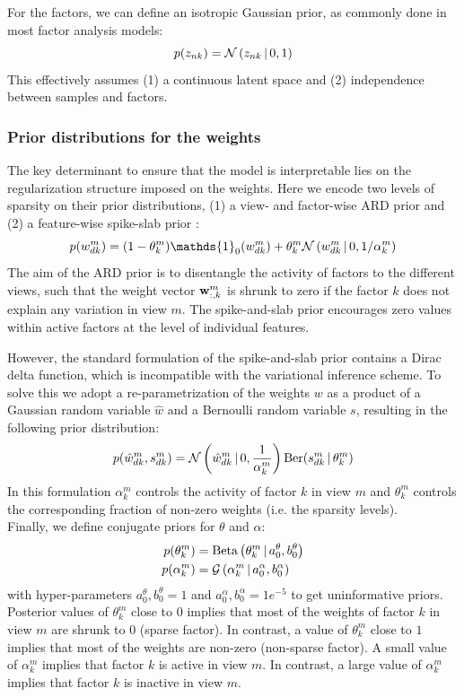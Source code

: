 For the factors, we can define an isotropic Gaussian prior, as commonly done in most factor analysis models:
\begin{equation}
	p(z_{nk}) = \mathcal{N}\left(z_{nk} \,|\, 0,1\right)
\end{equation}
This effectively  assumes (1) a continuous latent space and (2) independence between samples and factors. 

\subsubsection{Prior distributions for the weights}  \label{section:mofa_weights}

The key determinant to ensure that the model is interpretable lies on the regularization structure imposed on the weights. Here we encode two levels of sparsity on their prior distributions, (1) a view- and factor-wise ARD prior \cite{Mackay1996} and (2) a feature-wise spike-slab prior \cite{Mitchell1988}:
\begin{equation*}
	p(w_{dk}^{m}) = (1-\theta_{k}^{m}) \mathds{1}_0(w_{dk}^{m}) + \theta_{k}^{m} \Ndist{w_{dk}^{m}}{0, 1 / \alpha_{k}^{m}}
\end{equation*}
The aim of the ARD prior is to disentangle the activity of factors to the different views, such that the weight vector ${\bf w}_{:,k}^m$ is shrunk to zero if the factor $k$ does not explain any variation in view $m$. The spike-and-slab prior encourages zero values within active factors at the level of individual features.

However, the standard formulation of the spike-and-slab prior contains a Dirac delta function, which is incompatible with the variational inference scheme. To solve this we adopt a re-parametrization of the weights $w$ as a product of a Gaussian random variable $\hat{w}$ and a Bernoulli random variable $s$, \cite{Titsias2011} resulting in the following prior distribution:
\begin{equation}
	p(\hat{w}_{dk}^{m},s_{dk}^{m}) = \mathcal{N}\left(\hat{w}_{dk}^{m} \,|\, 0, \frac{1}{\alpha_k^m}\right)  \text{Ber}(s_{dk}^m \,|\,\theta_k^m)
\end{equation}
In this formulation $\alpha_k^m$ controls the activity of factor $k$ in view $m$ and $\theta_k^m$ controls the corresponding fraction of non-zero weights (i.e. the sparsity levels).\\

Finally, we define conjugate priors for $\theta$ and $\alpha$:
\begin{align}
	p(\theta_k^m) &= \text{Beta}\left(\theta_k^m \,|\, a_0^\theta,b_0^\theta\right)\\
	p(\alpha_k^m) &= \mathcal{G}\left(\alpha_k^m \,|\, a_0^\alpha, b_0^\alpha\right)
\end{align}
with hyper-parameters $a_0^\theta,b_0^\theta =1$ and $a_0^\alpha, b_0^\alpha=1e^{-5}$ to get uninformative priors. Posterior values of $\theta_k^m$ close to $0$ implies that most of the weights of factor $k$ in view $m$ are shrunk to $0$ (sparse factor). In contrast, a value of $\theta_k^m$ close to $1$ implies that most of the weights are non-zero (non-sparse factor). A small value of $\alpha_k^m$ implies that factor $k$ is active in view $m$. In contrast, a large value of $\alpha_k^m$ implies that factor $k$ is inactive in view $m$.

